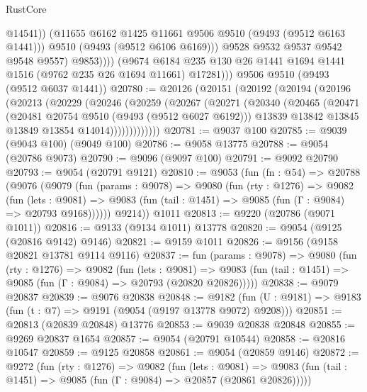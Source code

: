 \begin{lexlean}{RustCore}
\begin{coremodule}
                        @14541))
                    (@11655 @6162 @1425 @11661 @9506 @9510 (@9493 (@9512 @6163 @1441)))
                    @9510
                    (@9493 (@9512 @6106 @6169)))
                  @9528
                  @9532
                  @9537
                  @9542
                  @9548
                  @9557)
                @9853))))
        (@9674 @6184 @235 @130 @26 @1441 @1694 @1441 @1516 (@9762 @235 @26 @1694 @11661) @17281)))
    @9506
    @9510
    (@9493 (@9512 @6037 @1441))
@20780 := @20126
    (@20151
      (@20192
        (@20194
          (@20196
            (@20213
              (@20229
                (@20246
                  (@20259
                    (@20267
                      (@20271
                        (@20340
                          (@20465
                            (@20471
                              (@20481 @20754 @9510 (@9493 (@9512 @6027 @6192)))
                              @13839
                              @13842
                              @13845
                              @13849
                              @13854
                              @14014)))))))))))))
@20781 := @9037 @100
@20785 := @9039 (@9043 @100) (@9049 @100)
@20786 := @9058 @13775
@20788 := @9054 (@20786 @9073)
@20790 := @9096 (@9097 @100)
@20791 := @9092 @20790
@20793 := @9054 (@20791 @9121)
@20810 := @9053
    (fun (fn : @54) =>
    @20788
      (@9076
        (@9079
          (fun (params : @9078) =>
          @9080
            (fun (rty : @1276) =>
            @9082
              (fun (lets : @9081) =>
              @9083 (fun (tail : @1451) => @9085 (fun (Γ : @9084) => @20793 @9168))))))
        @9214))
    @1011
@20813 := @9220 (@20786 (@9071 @1011))
@20816 := @9133 (@9134 @1011) @13778
@20820 := @9054 (@9125 (@20816 @9142) @9146)
@20821 := @9159 @1011
@20826 := @9156 (@9158 @20821 @13781 @9114 @9116)
@20837 := fun (params : @9078) =>
  @9080
    (fun (rty : @1276) =>
    @9082
      (fun (lets : @9081) =>
      @9083 (fun (tail : @1451) => @9085 (fun (Γ : @9084) => @20793 (@20820 @20826)))))
@20838 := @9079 @20837
@20839 := @9076 @20838
@20848 := @9182
    (fun (U : @9181) => @9183 (fun (t : @7) => @9191 (@9054 (@9197 @13778 @9072) @9208)))
@20851 := @20813 (@20839 @20848) @13776
@20853 := @9039 @20838 @20848
@20855 := @9269 @20837 @1654
@20857 := @9054 (@20791 @10544)
@20858 := @20816 @10547
@20859 := @9125 @20858
@20861 := @9054 (@20859 @9146)
@20872 := @9272
    (fun (rty : @1276) =>
    @9082
      (fun (lets : @9081) =>
      @9083 (fun (tail : @1451) => @9085 (fun (Γ : @9084) => @20857 (@20861 @20826)))))

\end{coremodule}
\end{lexlean}
